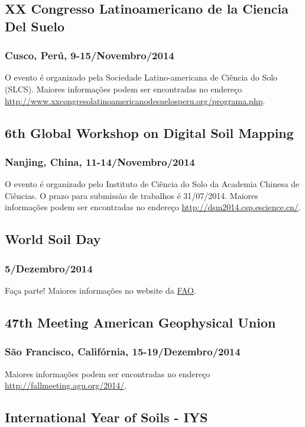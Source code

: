 \subsection{XX Congresso Latinoamericano de la Ciencia Del Suelo}
\subsubsection{Cusco, Perú, 9-15/Novembro/2014}
O evento é organizado pela Sociedade Latino-americana de Ciência do Solo (SLCS).
Maiores informações podem ser encontradas no endereço \url{http://www.xxcongresolatinoamericanodesuelosperu.org/programa.php}.

\subsection{6th Global Workshop on Digital Soil Mapping}
\subsubsection{Nanjing, China, 11-14/Novembro/2014}
O evento é  organizado pelo Instituto de Ciência do Solo da Academia Chinesa de Ciências. O prazo para submissão de trabalhos é 31/07/2014.
Maiores informações podem ser encontradas no endereço \url{http://dsm2014.csp.escience.cn/}.

\subsection{World Soil Day}
\subsubsection{5/Dezembro/2014}
Faça parte! Maiores informações no website da \href{http://www.fao.org/globalsoilpartnership/world-soil-day/en/}{FAO}.

\subsection{47th Meeting American Geophysical Union}
\subsubsection{São Francisco, Califórnia, 15-19/Dezembro/2014}
Maiores informações podem ser encontradas no endereço \url{http://fallmeeting.agu.org/2014/}.

\subsection{International Year of Soils - IYS}
